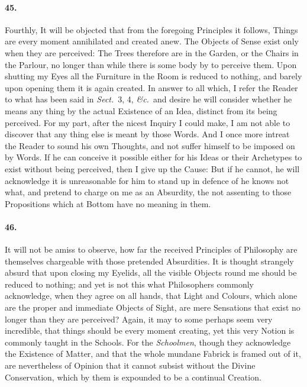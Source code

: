\documentclass[]{article}
\newenvironment{sectionbody}{\begin{multicols}{2}}{\end{multicols}}
\begin{document}
\begin{sectionbody}
\paragraph{45.} Fourthly, It will be objected that from the foregoing Principles
it follows, Things are every moment annihilated and created anew.
The Objects of Sense exist only when they are perceived: The
Trees therefore are in the Garden, or the Chairs in the Parlour,
no longer than while there is some body by to perceive them.
Upon shutting my Eyes all the Furniture in the Room is reduced to
nothing, and barely upon opening them it is again created.  In
answer to all which, I refer the Reader to what has been said in
\emph{Sect.}\ 3, 4, \emph{\&c.}\ and desire he will consider
whether he means any thing by the
actual Existence of an Idea, distinct from its being perceived.
For my part, after the nicest Inquiry I could make, I am not able
to discover that any thing else is meant by those Words.  And I
once more intreat the Reader to sound his own Thoughts, and not
suffer himself to be imposed on by Words.  If he can conceive it
possible either for his Ideas or their Archetypes to exist
without being perceived, then I give up the Cause: But if he
cannot, he will acknowledge it is unreasonable for him to stand
up in defence of he knows not what, and pretend to charge on me
as an Absurdity, the not assenting to those Propositions which at
Bottom have no meaning in them.



\paragraph{46.} It will not be amiss to observe, how far the received Principles
of Philosophy are themselves chargeable with those pretended
Absurdities.  It is thought strangely absurd that upon closing my
Eyelids, all the visible Objects round me should be reduced to
nothing; and yet is not this what Philosophers commonly
acknowledge, when they agree on all hands, that Light and
Colours, which alone are the proper and immediate Objects of
Sight, are mere Sensations that exist no longer than they are
perceived?  Again, it may to some perhaps seem very incredible,
that things should be every moment creating, yet this very Notion
is commonly taught in the Schools.  For the \emph{Schoolmen},
though they acknowledge the Existence of Matter, and that the
whole mundane Fabrick is framed out of it, are nevertheless of
Opinion that it cannot subsist without the Divine Conservation,
which by them is expounded to be a continual Creation.




\end{sectionbody}
\end{document}
